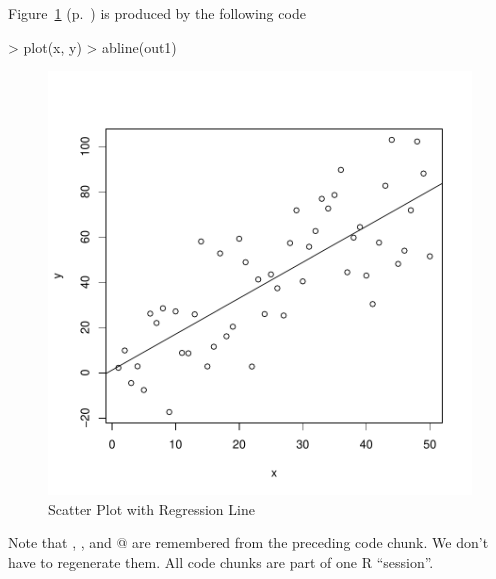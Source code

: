 \documentclass{article}
\begin{document}
Figure~\ref{fig:one} (p.~\pageref{fig:one})
is produced by the following code
\begin{Schunk}
\begin{Sinput}
> plot(x, y)
> abline(out1)
\end{Sinput}
\end{Schunk}
\begin{figure}
\begin{center}
\includegraphics{example-fig1}
\end{center}
\caption{Scatter Plot with Regression Line}
\label{fig:one}
\end{figure}
Note that \verb@x@, \verb@y@, and @ are remembered from
the preceding code chunk.  We don't have to regenerate them.
All code chunks are part of one R ``session''.
\end{document}
